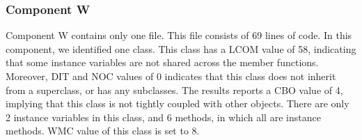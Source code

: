 \begin{table}[]
\end{table}

 

\subsubsection{Component W}
Component W contains only one file. This file consists of 69 lines of code. In this component, we identified one class. This class has a LCOM value of 58, indicating that some instance variables are not shared across the member functions. Moreover, DIT and NOC values of 0 indicates that this class does not inherit from a superclass, or has any subclasses. The results reports a CBO value of 4, implying that this class is not tightly coupled with other objects. There are only 2 instance variables in this class, and 6 methods, in which all are instance methods. WMC value of this class is set to 8.





